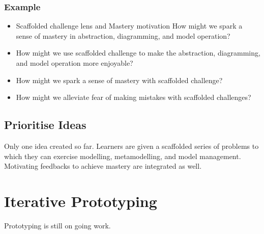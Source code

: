 \documentclass[12pt, a4paper]{report}
\begin{document}
\begin{appendices}
\subsubsection{Example}
\begin{itemize}
\item Scaffolded challenge lens and Mastery motivation
How might we spark a sense of mastery in abstraction,  diagramming, and model operation?
\item How might we use scaffolded challenge to make the abstraction, diagramming, and model operation more enjoyable?
\item How might we spark a sense of mastery with scaffolded challenge?
\item How might we alleviate fear of making mistakes with scaffolded challenges?
\end{itemize}

\subsection{Prioritise Ideas}
Only one idea created so far. Learners are given a scaffolded series of problems to which they can exercise modelling, metamodelling, and model management. Motivating feedbacks to achieve mastery are integrated as well.

\section{Iterative Prototyping}
Prototyping is still on going work.



\end{appendices}
\end{document}
